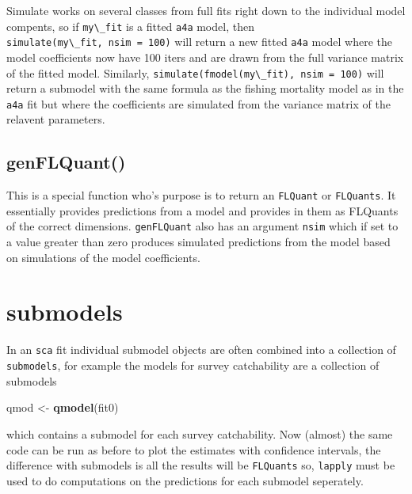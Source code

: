 \documentclass[
]{book}
\newenvironment{Shaded}{\begin{snugshade}}{\end{snugshade}}
\newcommand{\FunctionTok}[1]{\textcolor[rgb]{0.13,0.29,0.53}{\textbf{#1}}}
\newcommand{\NormalTok}[1]{#1}
\newcommand{\OtherTok}[1]{\textcolor[rgb]{0.56,0.35,0.01}{#1}}
\begin{document}
Simulate works on several classes from full fits right down to the individual model compents, so if \texttt{my\textbackslash{}\_fit} is a fitted \texttt{a4a} model, then \texttt{simulate(my\textbackslash{}\_fit,\ nsim\ =\ 100)} will return a new fitted \texttt{a4a} model where the model coefficients now have 100 iters and are drawn from the full variance matrix of the fitted model. Similarly, \texttt{simulate(fmodel(my\textbackslash{}\_fit),\ nsim\ =\ 100)} will return a submodel with the same formula as the fishing mortality model as in the \texttt{a4a} fit but where the coefficients are simulated from the variance matrix of the relavent parameters.

\hypertarget{genflquant}{%
\subsection{genFLQuant()}\label{genflquant}}

This is a special function who's purpose is to return an \texttt{FLQuant} or \texttt{FLQuants}. It essentially provides predictions from a model and provides in them as FLQuants of the correct dimensions. \texttt{genFLQuant} also has an argument \texttt{nsim} which if set to a value greater than zero produces simulated predictions from the model based on simulations of the model coefficients.

\hypertarget{submodels}{%
\section{submodels}\label{submodels}}

In an \texttt{sca} fit individual submodel objects are often combined into a collection of \texttt{submodels}, for example the models for survey catchability are a collection of submodels

\begin{Shaded}
\begin{Highlighting}[]
\NormalTok{qmod }\OtherTok{\textless{}{-}} \FunctionTok{qmodel}\NormalTok{(fit0)}
\end{Highlighting}
\end{Shaded}

which contains a submodel for each survey catchability. Now (almost) the same code can be run as before to plot the estimates with confidence intervals, the difference with submodels is all the results will be \texttt{FLQuants} so, \texttt{lapply} must be used to do computations on the predictions for each submodel seperately.
\end{document}
